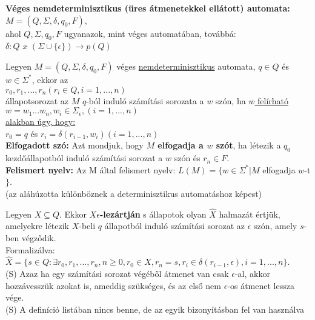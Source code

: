 \begin{frame}
\begin{tcolorbox}[title={Def.: Nemdeterminisztikus automata}]
\textbf{Véges nemdeterminisztikus (üres átmenetekkel ellátott) automata:}\\
\mmedskip
$M = (Q, {\Sigma}, {\delta}, q_0, F)$,\\
\mmedskip
ahol $Q, {\Sigma}, q_0, F$ ugyanazok, mint véges automatában, továbbá:\\
\mmedskip
$\delta : Q$ $x$ $({\Sigma} \cup \{{\epsilon}\}) \rightarrow p(Q)$
\end{tcolorbox}

\begin{tcolorbox}[title={squeezed Def.: Számítási sorozat, elfogadott szó, felismert nyelv}]
Legyen $M = (Q, {\Sigma}, {\delta}, q_0, F)$ véges \underline{nemdeterminisztikus} automata, $q \in Q$ és \underline{$w \in {\Sigma}^*$}, ekkor az\\
\mmedskip
$r_0, r_1, ..., r_n (r_i \in Q, i = 1, ..., n)$\\
\mmedskip
állapotsorozat az $M$ $q$-ból induló számítási sorozata a $w$ szón, ha \underline{$w$ felírható}\\
\mmedskip
\underline{$w = w_1 ... w_n, w_i \in {\Sigma}_{\epsilon}, (i = 1, ..., n)$}\\
\mmedskip
\underline{alakban úgy, hogy:}\\
\mmedskip
$r_0 = q$ és $r_i = {\delta}(r_{i - 1}, w_i)(i = 1, ..., n)$\\
\mbigskip
\textbf{Elfogadott szó:} Azt mondjuk, hogy \textbf{$M$ elfogadja a $w$ szót}, ha létezik a $q_0$ kezdőállapotból induló számítási sorozat a $w$ szón és $r_n \in F$.\\
\mbigskip
\textbf{Felismert nyelv:} Az M által felismert nyelv: $L(M) = \{w \in {\Sigma}^* | M$ elfogadja $w$-t$\}$.\\
\mbigskip
(az aláhúzotta különböznek a determinisztikus automatáshoz képest)
\end{tcolorbox}

\begin{tcolorbox}[title={Def.: $X \epsilon$-lezártja}]
Legyen $X \subseteq Q$. Ekkor \textbf{$X \epsilon$-lezártján} s állapotok olyan $\widehat{X}$ halmazát értjük, amelyekre létezik $X$-beli $q$ állapotból induló számítási sorozat az $\epsilon$ szón, amely $s$-ben végződik.\\
Formalizálva:\\
$\widehat{X} = \{s \in Q : {\exists}r_0,r_1,...,r_n, n \geq 0, r_0 \in X, r_n = s, r_i \in {\delta}(r_{i - 1}, {\epsilon}), i = 1, ..., n\}$.\\
{\tiny (S) Azaz ha egy számítási sorozat végéből átmenet van csak $\epsilon$-al, akkor hozzávesszük azokat is, ameddig szükséges, és az első nem $\epsilon$-os átmenet lessza vége.}\\
{\tiny (S) A definíció listában nincs benne, de az egyik bizonyításban fel van használva}
\end{tcolorbox}
\end{frame}

